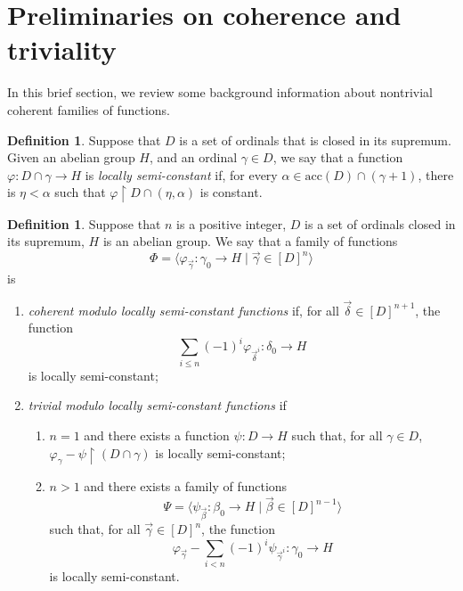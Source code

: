 \documentclass{amsart}
\numberwithin{theorem}{section}
\theoremstyle{definition}
\newtheorem{definition}[theorem]{Definition}
\newcommand{\acc}{\mathrm{acc}}
\newcommand{\ra}{\rightarrow}
\begin{document}
\section{Preliminaries on coherence and triviality} \label{section: prelim}

In this brief section, we review some background information about nontrivial coherent families 
of functions.

\begin{definition}
  Suppose that $D$ is a set of ordinals that is closed in its supremum. 
  Given an abelian group $H$, and an ordinal $\gamma \in D$, we say that a function 
  $\varphi:D \cap \gamma \ra H$ is \emph{locally semi-constant} if, for every 
  $\alpha \in \acc(D) \cap (\gamma + 1)$, there is $\eta < \alpha$ such that 
  $\varphi \restriction D \cap (\eta,\alpha)$ is constant.
\end{definition}

\begin{definition} \label{def: coh_triv_def}
  Suppose that $n$ is a positive integer, $D$ is a set of ordinals closed in its 
  supremum, $H$ is an abelian group. We say that a family of functions
  \[
    \Phi = \langle \varphi_{\vec{\gamma}}:\gamma_0 \ra H \mid \vec{\gamma} \in 
    [D]^n \rangle
  \]
  is
  \begin{enumerate}
    \item \emph{coherent modulo locally semi-constant functions} if, for all 
    $\vec{\delta} \in [D]^{n+1}$, the function
    \[
      \sum_{i \leq n} (-1)^i \varphi_{\vec{\delta}^i} : \delta_0 \ra H
    \]
    is locally semi-constant;
    \item \emph{trivial modulo locally semi-constant functions} if
    \begin{enumerate}
      \item $n = 1$ and there exists a function $\psi : D \ra H$ such that, 
      for all $\gamma \in D$, $\varphi_\gamma - \psi \restriction (D \cap \gamma)$ 
      is locally semi-constant;
      \item $n > 1$ and there exists a family of functions
      \[
        \Psi = \langle \psi_{\vec{\beta}}: \beta_0 \ra H \mid 
        \vec{\beta} \in [D]^{n-1} \rangle
      \]
      such that, for all $\vec{\gamma} \in [D]^n$, the function
      \[
        \varphi_{\vec{\gamma}} - \sum_{i < n} (-1)^i \psi_{\vec{\gamma}^i}: 
        \gamma_0 \ra H
      \]
      is locally semi-constant.
    \end{enumerate}
  \end{enumerate}
\end{definition}
\end{document}
